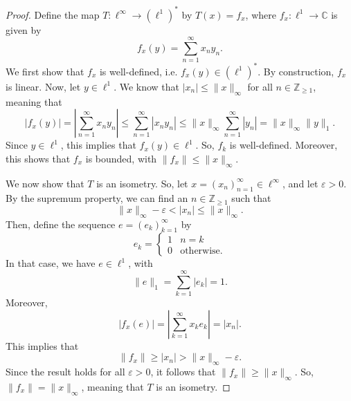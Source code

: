 \documentclass[a4paper, openany]{memoir}
\theoremstyle{definition}
\theoremstyle{plain}
\begin{document}
    \begin{proof}
        Define the map $T \colon \ell^\infty \to (\ell^1)^*$ by $T(x) = f_x$, where $f_x \colon \ell^1 \to \mathbb{C}$ is given by 
        \[f_x(y) = \sum_{n=1}^\infty x_n y_n.\]
        We first show that $f_x$ is well-defined, i.e. $f_x(y) \in (\ell^1)^*$. By construction, $f_x$ is linear. Now, let $y \in \ell^1$. We know that $|x_n| \leq \lVert x \rVert_\infty$ for all $n \in \mathbb{Z}_{\geq 1}$, meaning that
        \[|f_x(y)| = \left| \sum_{n=1}^\infty x_n y_n \right| \leq \sum_{n=1}^{\infty} |x_n y_n| \leq \lVert x \rVert_\infty \sum_{n=1}^\infty |y_n| = \lVert x \rVert_\infty \lVert y \rVert_1.\]
        Since $y \in \ell^1$, this implies that $f_x(y) \in \ell^1$. So, $f_k$ is well-defined. Moreover, this shows that $f_x$ is bounded, with $\lVert f_x \rVert \leq \lVert x \rVert_\infty$.

        We now show that $T$ is an isometry. So, let $x = (x_n)_{n=1}^\infty \in \ell^\infty$, and let $\varepsilon > 0$. By the supremum property, we can find an $n \in \mathbb{Z}_{\geq 1}$ such that 
        \[\lVert x \rVert_\infty - \varepsilon < |x_n| \leq \lVert x \rVert_\infty.\]
        Then, define the sequence $e = (e_k)_{k=1}^\infty$ by 
        \[e_k = \begin{cases}
            1 & n = k \\
            0 & \textrm{otherwise}.
        \end{cases}\]
        In that case, we have $e \in \ell^1$, with 
        \[\lVert e \rVert_1 = \sum_{k=1}^\infty |e_k| = 1.\]
        Moreover,
        \[|f_x(e)| = \left| \sum_{k=1}^\infty x_k e_k \right| = |x_n|.\]
        This implies that 
        \[\lVert f_x \rVert \geq |x_n| > \lVert x \rVert_\infty - \varepsilon .\]
        Since the result holds for all $\varepsilon > 0$, it follows that $\lVert f_x \rVert \geq \lVert x \rVert_\infty$. So, $\lVert f_x \rVert = \lVert x \rVert_\infty$, meaning that $T$ is an isometry.


\end{proof}
\end{document}
